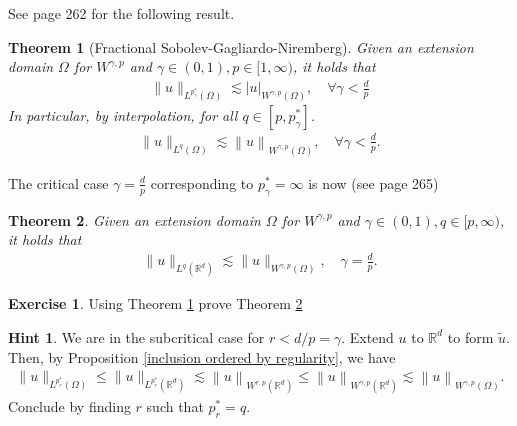 \documentclass[
    a4paper,
    DIV=14,
    abstract=true,
    numbers=noenddot
]
{scrartcl}
\newtheorem{theorem}{Theorem}[section]
\theoremstyle{definition}
\newtheorem{exercise}{Exercise}
\newtheorem*{hint}{Hint}
\newcommand{\tl}[1]{\widetilde{#1}}
\renewcommand{\norm}[1]{\left\lVert #1 \right\rVert}\renewcommand{\abs}[1]{\left| #1 \right|}
\newcommand{\R}{\mathbb{R}}
\begin{document}
See \cite{leoni2023first} page 262 for the following result.
\begin{theorem}[Fractional Sobolev-Gagliardo-Niremberg]\label{subcritical embedding}
    Given an extension domain $\Omega $ for $W^{\gamma,p}$ and $\gamma \in (0,1), p \in [1,\infty)$, it holds that
    \begin{align*}
        \|u\|_{L^{p_\gamma^*}(\Omega )} \lesssim |u|_{W^{\gamma, p}(\Omega )}, \quad\forall \gamma <  \frac{d}{p}
    \end{align*}
    In particular, by interpolation, for all $q \in [p,p_\gamma^*]$.
    \begin{align*}
        \|u\|_{L^{q}(\Omega )} \lesssim \norm{u}_{W^{\gamma, p}(\Omega )}, \quad\forall \gamma <  \frac{d}{p}.
    \end{align*}
\end{theorem}
The critical case $\gamma=\frac{d}{p}$ corresponding to $p_\gamma^*=\infty$ is now (see \cite{leoni2023first} page 265)
\begin{theorem}\label{critical embedding}
    Given an extension domain $\Omega $ for $W^{\gamma,p}$ and  $\gamma \in (0,1), q \in [p,\infty)$, it holds that
    \begin{align*}
        \|u\|_{L^q(\R^d)} \lesssim\|u\|_{W^{\gamma, p}(\Omega)}, \quad \gamma =  \frac{d}{p}.
    \end{align*}
\end{theorem}
\begin{exercise}
    Using Theorem \ref{subcritical embedding} prove Theorem \ref{critical embedding}
\end{exercise}
\begin{hint}
    We are in the subcritical case for $r<d/p=\gamma$. Extend $u$ to $\R^d$ to form $\tl{u}$. Then, by Proposition \ref{inclusion ordered by regularity}, we have
    \begin{align*}
        \|u\|_{L^{p_r^*}(\Omega )}\leq \|u\|_{L^{p_r^*}(\R^d )}  \lesssim \norm{u}_{W^{r, p}(\R^d )}\leq \norm{u}_{W^{\gamma, p}(\R^d  )}\lesssim \norm{u}_{W^{\gamma, p}(\Omega )}.
    \end{align*}
    Conclude by finding $r$ such that $p_r^*=q$.
\end{hint}
\end{document}
